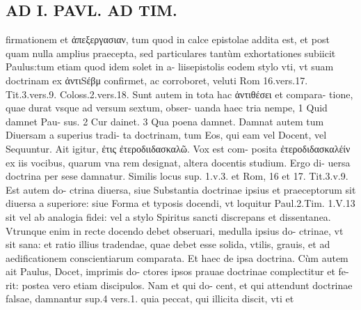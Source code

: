 \documentclass{article}
\begin{document}
\begin{pages}
\section*{AD I. PAVL. AD TIM. }
\marginpar{[ p.414 ]}\pstart firmationem et ἀπεξεργασιαν, tum quod in calce epistolae addita est, et post quam nulla amplius praecepta, sed particulares tantùm exhortationes subiicit Paulus:tum etiam quod idem solet in a- liisepistolis eodem stylo vti, vt suam doctrinam ex ἀντιSέβμ confirmet, ac corroboret, veluti Rom 16.vers.17. Tit.3.vers.9. Coloss.2.vers.18.  \pend\pstart Sunt autem in tota hac ἀντιθέσει et compara- tione, quae durat vsque ad versum sextum, obser- uanda haec tria nempe, 1 Quid damnet Pau- sus. 2 Cur dainet. 3 Qua poena damnet. Damnat autem tum Diuersam a superius tradi- ta doctrinam, tum Eos, qui eam vel Docent, vel Sequuntur.  \pend\pstart Ait igitur, ἐτις ἐτεροδιιδασκαλῶ. Vox est com- posita ἐτεροδιδασκαλέίν ex iis vocibus, quarum vna rem designat, altera docentis studium. Ergo di- uersa doctrina per sese damnatur. Similis locus sup. 1.v.3. et Rom, 16 et 17. Tit.3.v.9. Est autem do- ctrina diuersa, siue Substantia doctrinae ipsius et praeceptorum sit diuersa a superiore: siue Forma et typosis docendi, vt loquitur Paul.2.Tim. 1.V.13 sit vel ab analogia fidei: vel a stylo Spiritus sancti discrepans et dissentanea. Vtrunque  enim in recte docendo debet obseruari, medulla ipsius do- ctrinae, vt sit sana: et ratio illius tradendae, quae debet esse solida, vtilis, grauis, et ad aedificationem conscientiarum comparata. Et haec de ipsa doctrina.  \pend\pstart Cùm autem ait Paulus, Docet, imprimis do- ctores ipsos prauae doctrinae complectitur et fe- rit: postea vero etiam discipulos. Nam et qui do- cent, et qui attendunt doctrinae falsae, damnantur sup.4 vers.1. quia peccat, qui illicita discit, vti et  \pend

\end{pages}
\end{document}
